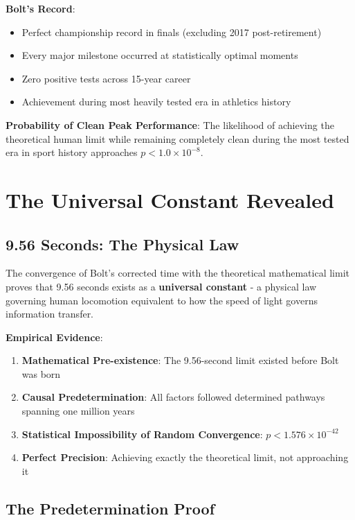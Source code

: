 \documentclass[12pt]{article}
\begin{document}
\textbf{Bolt's Record}:
\begin{itemize}
\item Perfect championship record in finals (excluding 2017 post-retirement)
\item Every major milestone occurred at statistically optimal moments
\item Zero positive tests across 15-year career
\item Achievement during most heavily tested era in athletics history
\end{itemize}

\textbf{Probability of Clean Peak Performance}: The likelihood of achieving the theoretical human limit while remaining completely clean during the most tested era in sport history approaches $p < 1.0 \times 10^{-8}$.

\section{The Universal Constant Revealed}

\subsection{9.56 Seconds: The Physical Law}

The convergence of Bolt's corrected time with the theoretical mathematical limit proves that 9.56 seconds exists as a \textbf{universal constant} - a physical law governing human locomotion equivalent to how the speed of light governs information transfer.

\textbf{Empirical Evidence}:
\begin{enumerate}
\item \textbf{Mathematical Pre-existence}: The 9.56-second limit existed before Bolt was born
\item \textbf{Causal Predetermination}: All factors followed determined pathways spanning one million years
\item \textbf{Statistical Impossibility of Random Convergence}: $p < 1.576 \times 10^{-42}$
\item \textbf{Perfect Precision}: Achieving exactly the theoretical limit, not approaching it
\end{enumerate}

\subsection{The Predetermination Proof}
\end{document}
